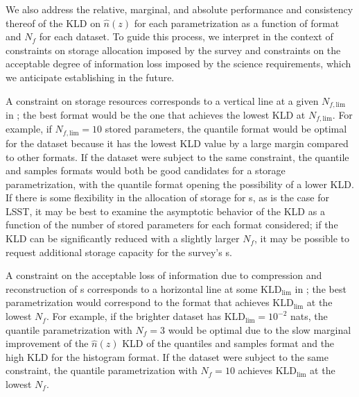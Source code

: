 We also address the relative, marginal, and absolute performance and 
consistency thereof of the KLD on $\hat{n}(z)$ for each parametrization as a 
function of format and $N_{f}$ for each dataset.
To guide this process, we interpret  in the context of 
constraints on storage allocation imposed by the survey and constraints on the 
acceptable degree of information loss imposed by the science requirements, 
which we anticipate establishing in the future.

A constraint on storage resources corresponds to a vertical line at a given 
$N_{f, \mathrm{lim}}$ in ; the best format would be the one 
that achieves the lowest KLD at $N_{f, \mathrm{lim}}$.
For example, if $N_{f, \mathrm{lim}}=10$ stored parameters, the quantile format 
would be optimal for the \mgdata dataset because it has the lowest KLD value by 
a large margin compared to other formats.
If the \ssdata dataset were subject to the same constraint, the quantile and 
samples formats would both be good candidates for a storage parametrization, 
with the quantile format opening the possibility of a lower KLD.
If there is some flexibility in the allocation of storage for \pz s, as is the 
case for LSST, it may be best to examine the asymptotic behavior of the KLD as 
a function of the number of stored parameters for each format considered; if 
the KLD can be significantly reduced with a slightly larger $N_{f}$, it may be 
possible to request additional storage capacity for the survey's \pz s.

A constraint on the acceptable loss of information due to compression and 
reconstruction of \pz s corresponds to a horizontal line at some 
$\mathrm{KLD}_{\mathrm{lim}}$ in ; the best parametrization 
would correspond to the format that achieves $\mathrm{KLD}_{\mathrm{lim}}$ at 
the lowest $N_{f}$.
For example, if the brighter dataset has $\mathrm{KLD}_{\mathrm{lim}}=10^{-2}$ 
nats, the quantile parametrization with $N_{f}=3$ would be optimal due to the 
slow marginal improvement of the $\hat{n}(z)$ KLD of the quantiles and samples 
format and the high KLD for the histogram format.
If the \ssdata dataset were subject to the same constraint, the quantile 
parametrization with $N_{f}=10$ achieves $\mathrm{KLD}_{\mathrm{lim}}$ at the 
lowest $N_{f}$.



